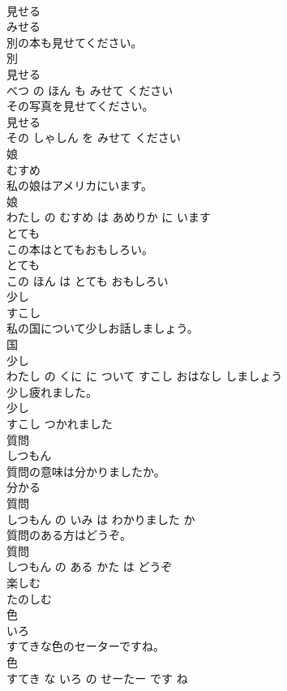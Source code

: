\documentclass[8pt]{extreport}
\begin{document}
\begin{CJK}{UTF8}{min}
\\	見せる	
\\	みせる			
\\	別の本も見せてください。	
\\	別 
\\	見せる 
\\	べつ の ほん も みせて ください			
\\	その写真を見せてください。	
\\	見せる 
\\	その しゃしん を みせて ください			
\\	娘	
\\	むすめ			
\\	私の娘はアメリカにいます。	
\\	娘 
\\	わたし の むすめ は あめりか に います			
\\	とても	
\\	この本はとてもおもしろい。	
\\	とても 
\\	この ほん は とても おもしろい			
\\	少し	
\\	すこし			
\\	私の国について少しお話しましょう。	
\\	国 
\\	少し 
\\	わたし の くに に ついて すこし おはなし しましょう			
\\	少し疲れました。	
\\	少し 
\\	すこし つかれました			
\\	質問	
\\	しつもん			
\\	質問の意味は分かりましたか。	
\\	分かる 
\\	質問 
\\	しつもん の いみ は わかりました か			
\\	質問のある方はどうぞ。	
\\	質問 
\\	しつもん の ある かた は どうぞ			
\\	楽しむ	
\\	たのしむ			
\\	色	
\\	いろ			
\\	すてきな色のセーターですね。	
\\	色 
\\	すてき な いろ の せーたー です ね			

\end{CJK}
\end{document}
